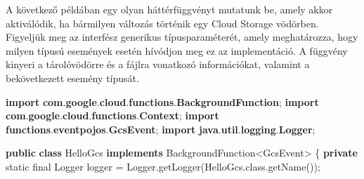 \documentclass[
]{article}
\newenvironment{Shaded}{}{}
\newcommand{\BuiltInTok}[1]{\textcolor[rgb]{0.00,0.50,0.00}{#1}}
\newcommand{\DataTypeTok}[1]{\textcolor[rgb]{0.56,0.13,0.00}{#1}}
\newcommand{\FunctionTok}[1]{\textcolor[rgb]{0.02,0.16,0.49}{#1}}
\newcommand{\ImportTok}[1]{\textcolor[rgb]{0.00,0.50,0.00}{\textbf{#1}}}
\newcommand{\KeywordTok}[1]{\textcolor[rgb]{0.00,0.44,0.13}{\textbf{#1}}}
\newcommand{\NormalTok}[1]{#1}
\newcommand{\OperatorTok}[1]{\textcolor[rgb]{0.40,0.40,0.40}{#1}}
\begin{document}
A következő példában egy olyan háttérfüggvényt mutatunk be, amely akkor
aktiválódik, ha bármilyen változás történik egy Cloud Storage vödörben.
Figyeljük meg az interfész generikus típusparaméterét, amely
meghatározza, hogy milyen típusú események esetén hívódjon meg ez az
implementáció. A függvény kinyeri a tárolóvödörre és a fájlra vonatkozó
információkat, valamint a bekövetkezett esemény típusát.

\begin{Shaded}
\begin{Highlighting}[]
\KeywordTok{import} \ImportTok{com}\OperatorTok{.}\ImportTok{google}\OperatorTok{.}\ImportTok{cloud}\OperatorTok{.}\ImportTok{functions}\OperatorTok{.}\ImportTok{BackgroundFunction}\OperatorTok{;}
\KeywordTok{import} \ImportTok{com}\OperatorTok{.}\ImportTok{google}\OperatorTok{.}\ImportTok{cloud}\OperatorTok{.}\ImportTok{functions}\OperatorTok{.}\ImportTok{Context}\OperatorTok{;}
\KeywordTok{import} \ImportTok{functions}\OperatorTok{.}\ImportTok{eventpojos}\OperatorTok{.}\ImportTok{GcsEvent}\OperatorTok{;}
\KeywordTok{import} \ImportTok{java}\OperatorTok{.}\ImportTok{util}\OperatorTok{.}\ImportTok{logging}\OperatorTok{.}\ImportTok{Logger}\OperatorTok{;}

\KeywordTok{public} \KeywordTok{class}\NormalTok{ HelloGcs }\KeywordTok{implements}\NormalTok{ BackgroundFunction}\OperatorTok{\textless{}}\NormalTok{GcsEvent}\OperatorTok{\textgreater{}} \OperatorTok{\{}
  \KeywordTok{private} \DataTypeTok{static} \DataTypeTok{final} \BuiltInTok{Logger}\NormalTok{ logger }\OperatorTok{=} \BuiltInTok{Logger}\OperatorTok{.}\FunctionTok{getLogger}\OperatorTok{(}\NormalTok{HelloGcs}\OperatorTok{.}\FunctionTok{class}\OperatorTok{.}\FunctionTok{getName}\OperatorTok{());}


\end{Highlighting}
\end{Shaded}
\end{document}

